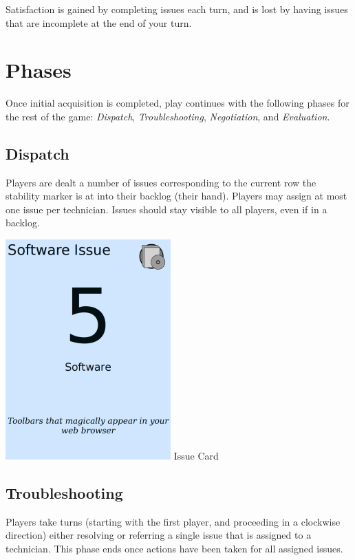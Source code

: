 \documentclass[twocolumn]{article}
\begin{document}
Satisfaction is gained by completing issues each turn, and is lost by having issues that are incomplete at the end of your turn.

\section*{Phases}

Once initial acquisition is completed, play continues with the following phases for the rest of the game: \emph{Dispatch}, \emph{Troubleshooting}, \emph{Negotiation}, and \emph{Evaluation}.

\subsection*{Dispatch}

Players are dealt a number of issues corresponding to the current row the stability marker is at into their backlog (their hand). Players may assign at most one issue per technician. Issues should stay visible to all players, even if in a backlog. \newline

\includegraphics[scale=1]{issue_example}
\newline
\small{Issue Card}

\subsection*{Troubleshooting}

Players take turns (starting with the first player, and proceeding in a clockwise direction) either
resolving or referring a single issue that is assigned to a technician. This phase ends once actions have been taken for all assigned issues.
\end{document}

